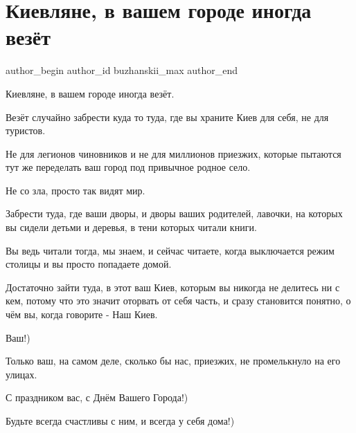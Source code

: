  
 
 
 
 
 
\section{Киевляне, в вашем городе иногда везёт}
\label{sec:30_05_2021.fb.buzhanskii_max.1.kievljane_vezenie}
\ifcmt
 author_begin
   author_id buzhanskii_max
 author_end
\fi

Киевляне, в вашем городе иногда везёт.

Везёт случайно забрести куда то туда, где вы храните Киев для себя, не для
туристов.

Не для легионов чиновников и не для миллионов приезжих, которые пытаются тут же
переделать ваш город под привычное родное село.

Не со зла, просто так видят мир.

Забрести туда, где ваши дворы, и дворы ваших родителей, лавочки, на которых вы
сидели детьми и деревья, в тени которых читали книги.

Вы ведь читали тогда, мы знаем, и сейчас читаете, когда выключается режим
столицы и вы просто попадаете домой.

Достаточно зайти туда, в этот ваш Киев, которым вы никогда не делитесь ни с
кем, потому что это значит оторвать от себя часть, и сразу становится понятно,
о чём вы, когда говорите - Наш Киев.

Ваш!)

Только ваш, на самом деле, сколько бы нас, приезжих, не промелькнуло на его улицах.

С праздником вас, с Днём Вашего Города!)

Будьте всегда счастливы с ним, и всегда у себя дома!)

